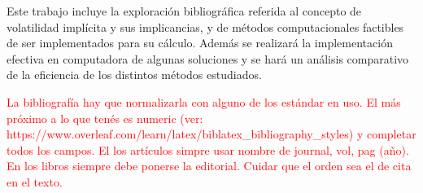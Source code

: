\documentclass[a4paper,openright, 12pt, oneside]{book}
\begin{document}
\vspace{5mm}

Este trabajo incluye la exploración bibliográfica referida al concepto de volatilidad implícita y sus implicancias, y de métodos computacionales factibles de ser implementados para su cálculo. Además se realizará la implementación efectiva en computadora de algunas soluciones y se hará un análisis comparativo de la eficiencia de los distintos métodos estudiados.




\tableofcontents















\textcolor{red}{La bibliografía hay que normalizarla con alguno de los estándar en uso. El más próximo a lo que tenés es numeric (ver: https://www.overleaf.com/learn/latex/biblatex\_bibliography\_styles) y completar todos los campos. 
El los artículos simpre usar nombre de journal, vol, pag (año). En los libros siempre debe ponerse la editorial. Cuidar que el orden sea el de cita en el texto.}

{}


\end{document}
